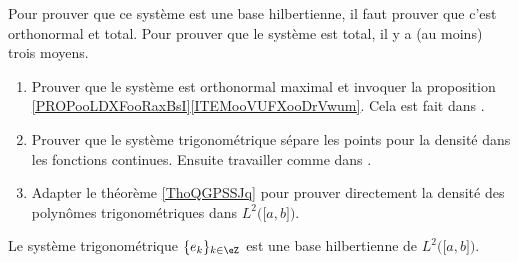 \begin{normaltext}
    Pour prouver que ce système est une base hilbertienne, il faut prouver que c'est orthonormal et total. Pour prouver que le système est total, il y a (au moins) trois moyens.
    \begin{enumerate}
        \item
            Prouver que le système est orthonormal maximal et invoquer la proposition \ref{PROPooLDXFooRaxBsI}\ref{ITEMooVUFXooDrVwum}. Cela est fait dans \cite{BIBooZYKMooGGbwyI}.
        \item
            Prouver que le système trigonométrique sépare les points pour la densité dans les fonctions continues. Ensuite travailler comme dans \cite{BIBooQLKHooOlskCs}.
        \item
            Adapter le théorème \ref{ThoQGPSSJq} pour prouver directement la densité des polynômes trigonométriques dans \( L^2\big( \mathopen[ a , b \mathclose] \big)\).
    \end{enumerate}
\end{normaltext}

\begin{theorem}       \label{THOooAVWIooDhnjpN}
    Le système trigonométrique \( \{ e_k \}_{k\in \eZ}\) est une base hilbertienne de \( L^2\big( \mathopen[ a , b \mathclose] \big)\).
\end{theorem}

